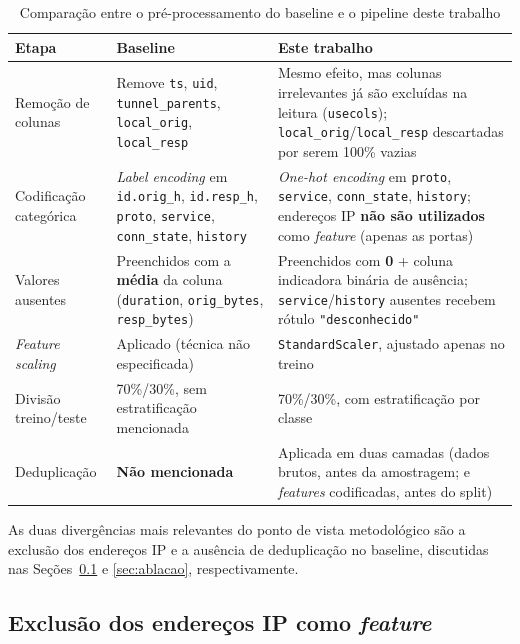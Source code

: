 \begin{table}[htbp]
\centering
\caption{Comparação entre o pré-processamento do baseline e o pipeline deste trabalho}
\label{tab:comparacao-metodologica}
\begin{tabular}{@{}p{3.2cm}p{4.3cm}p{4.3cm}@{}}
\toprule
\textbf{Etapa} & \textbf{Baseline} & \textbf{Este trabalho} \\
\midrule
Remoção de colunas & Remove \texttt{ts}, \texttt{uid}, \texttt{tunnel\_parents}, \texttt{local\_orig}, \texttt{local\_resp} & Mesmo efeito, mas colunas irrelevantes já são excluídas na leitura (\texttt{usecols}); \texttt{local\_orig}/\texttt{local\_resp} descartadas por serem 100\% vazias \\
Codificação categórica & \textit{Label encoding} em \texttt{id.orig\_h}, \texttt{id.resp\_h}, \texttt{proto}, \texttt{service}, \texttt{conn\_state}, \texttt{history} & \textit{One-hot encoding} em \texttt{proto}, \texttt{service}, \texttt{conn\_state}, \texttt{history}; endereços IP \textbf{não são utilizados} como \textit{feature} (apenas as portas) \\
Valores ausentes & Preenchidos com a \textbf{média} da coluna (\texttt{duration}, \texttt{orig\_bytes}, \texttt{resp\_bytes}) & Preenchidos com \textbf{0} + coluna indicadora binária de ausência; \texttt{service}/\texttt{history} ausentes recebem rótulo \texttt{"desconhecido"} \\
\textit{Feature scaling} & Aplicado (técnica não especificada) & \texttt{StandardScaler}, ajustado apenas no treino \\
Divisão treino/teste & 70\%/30\%, sem estratificação mencionada & 70\%/30\%, com estratificação por classe \\
Deduplicação & \textbf{Não mencionada} & Aplicada em duas camadas (dados brutos, antes da amostragem; e \textit{features} codificadas, antes do split) \\
\bottomrule
\end{tabular}
\end{table}

As duas divergências mais relevantes do ponto de vista metodológico são a exclusão dos endereços IP e a ausência de deduplicação no baseline, discutidas nas Seções~\ref{sec:discussao-ip} e \ref{sec:ablacao}, respectivamente.

\subsection{Exclusão dos endereços IP como \textit{feature}}
\label{sec:discussao-ip}

